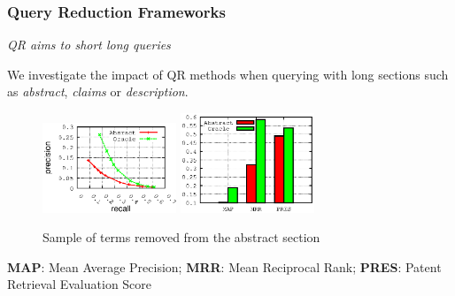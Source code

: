 \documentclass[xcolor=x11names,compress]{beamer}
\renewcommand{\(}{\begin{columns}}
\renewcommand{\)}{\end{columns}}
\newcommand{\<}[1]{\begin{column}{#1}}
\renewcommand{\>}{\end{column}}
\begin{document}
\begin{frame}
\frametitle{Query Reduction Frameworks}

{\color{DeepSkyBlue4}\textit{QR aims to short long queries}}

\vspace{0.3cm}
We investigate the impact of QR methods when 
querying with long sections such as \textit{abstract}, \textit{claims} or \textit{description}.

\begin{figure}
\begin{center}
\includegraphics[width=4cm]{../analysis/precision-recall_ByField-CLEF-IP_2010}
\includegraphics[width=4cm]{../analysis/MAP-MRR_ByField-CLEF-IP_2010}
\caption{Sample of terms removed from the abstract section}
\end{center}
\end{figure}

\begin{tiny}
\textbf{MAP}: Mean Average Precision;  \textbf{MRR}: Mean Reciprocal Rank; \textbf{PRES}: Patent Retrieval Evaluation Score
\end{tiny}
\end{frame}
\end{document}

